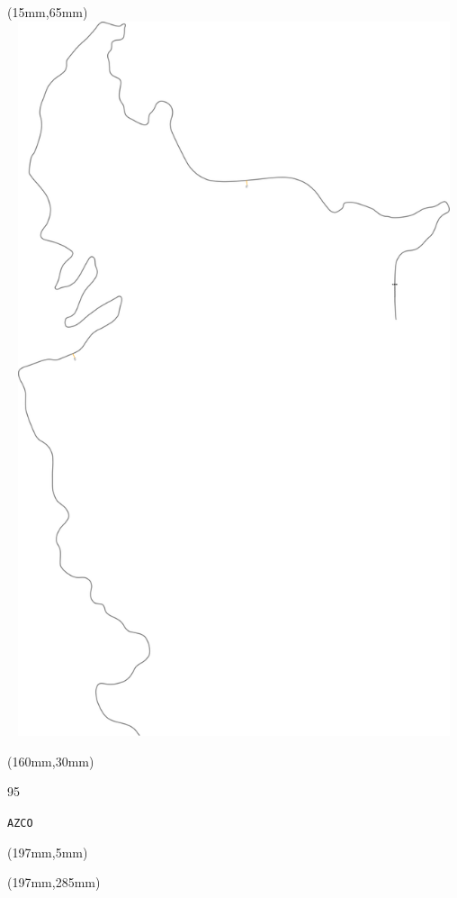 \begin{textblock*}{185mm}(15mm,65mm)%
\centering
\mbox{\includegraphics[width=185mm,height=210mm,keepaspectratio]{PT/AZCO.pdf}}
\end{textblock*}
\begin{textblock*}{40mm}(160mm,30mm)%
\Large
\par{} 
\par95 
\par\hfill\tiny\tt AZCO\\
\end{textblock*}
\begin{textblock*}{20mm}(197mm,5mm)%
\fbox{\thepage}
\label{AZCO}
\end{textblock*}
\begin{textblock*}{20mm}(197mm,285mm)%
\fbox{\thepage}
\end{textblock*}

